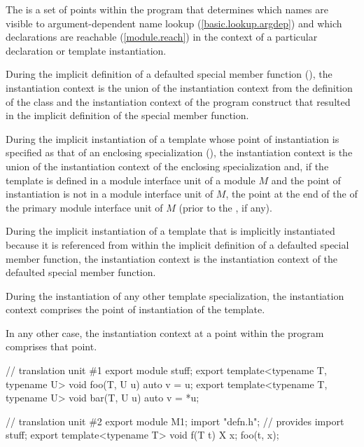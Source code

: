 \begin{std.txt}\color{addclr}
\pnum
The  is a set of points within the program
that determines which names are visible to argument-dependent name lookup
(\ref{basic.lookup.argdep})
and which declarations are reachable (\ref{module.reach})
in the context of a particular declaration or template instantiation.

\pnum
During the implicit definition of a defaulted special member function
(),
the instantiation context is the union of
the instantiation context from the definition of the class and
the instantiation context of the program construct that
resulted in the implicit definition of the special member function.

\pnum
During the implicit instantiation of a template
whose point of instantiation is specified as
that of an enclosing specialization (),
the instantiation context is the union of
the instantiation context of the enclosing specialization and,
if the template is defined in a module interface unit of a module $M$
and the point of instantiation is not in a module interface unit of $M$,
the point at the end of the
 of the
primary module interface unit of $M$
(prior to the , if any).

\pnum
During the implicit instantiation of a template
that is implicitly instantiated because it is referenced
from within the implicit definition of a defaulted special member function,
the instantiation context is the instantiation context of
the defaulted special member function.

\pnum
During the instantiation of any other template specialization,
the instantiation context comprises the point of instantiation
of the template.

\pnum
In any other case, the instantiation context
at a point within the program
comprises that point.

\pnum
\begin{example}
\begin{codeblock}
// translation unit \#1
export module stuff;
export template<typename T, typename U> void foo(T, U u) { auto v = u; }
export template<typename T, typename U> void bar(T, U u) { auto v = *u; }

// translation unit \#2
export module M1;
import "defn.h";        // provides 
import stuff;
export template<typename T> void f(T t) {
  X x;
  foo(t, x);
}


\end{codeblock}
\end{example}
\end{std.txt}
